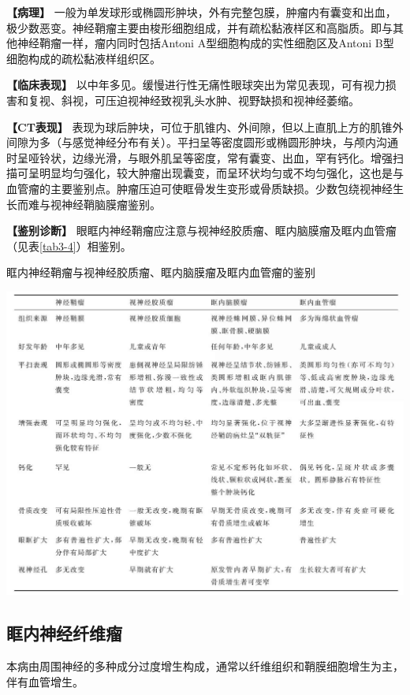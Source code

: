 \textbf{【病理】}
一般为单发球形或椭圆形肿块，外有完整包膜，肿瘤内有囊变和出血，极少数恶变。神经鞘瘤主要由梭形细胞组成，并有疏松黏液样区和高脂质。即与其他神经鞘瘤一样，瘤内同时包括Antoni
A型细胞构成的实性细胞区及Antoni B型细胞构成的疏松黏液样组织区。

\textbf{【临床表现】}
以中年多见。缓慢进行性无痛性眼球突出为常见表现，可有视力损害和复视、斜视，可压迫视神经致视乳头水肿、视野缺损和视神经萎缩。

\textbf{【CT表现】}
表现为球后肿块，可位于肌锥内、外间隙，但以上直肌上方的肌锥外间隙为多（与感觉神经分布有关）。平扫呈等密度圆形或椭圆形肿块，与颅内沟通时呈哑铃状，边缘光滑，与眼外肌呈等密度，常有囊变、出血，罕有钙化。增强扫描可呈明显均匀强化，较大肿瘤出现囊变，而呈环状均匀或不均匀强化，这也是与血管瘤的主要鉴别点。肿瘤压迫可使眶骨发生变形或骨质缺损。少数包绕视神经生长而难与视神经鞘脑膜瘤鉴别。

\textbf{【鉴别诊断】}
眼眶内神经鞘瘤应注意与视神经胶质瘤、眶内脑膜瘤及眶内血管瘤（见表\ref{tab3-4}）相鉴别。

\begin{table}[htbp]
\centering
\caption{眶内神经鞘瘤与视神经胶质瘤、眶内脑膜瘤及眶内血管瘤的鉴别}
\label{tab3-4}
\includegraphics[width=\textwidth,height=\textheight,keepaspectratio]{./images/Image00105.jpg}
\end{table}

\subsection{眶内神经纤维瘤}

本病由周围神经的多种成分过度增生构成，通常以纤维组织和鞘膜细胞增生为主，伴有血管增生。


